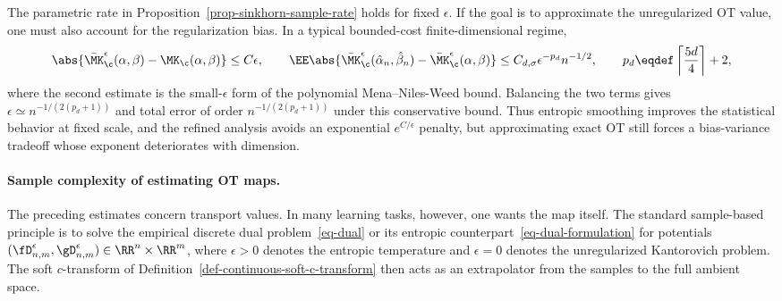 \begin{rem}\label{rem-sinkhorn-no-free-lunch}
	The parametric rate in Proposition~\ref{prop-sinkhorn-sample-rate} holds for fixed $\epsilon$. If the goal is to approximate the unregularized OT value, one must also account for the regularization bias. In a typical bounded-cost finite-dimensional regime,
	\[
		\abs{\bar\MK_\c^\epsilon(\alpha,\beta)-\MK_\c(\alpha,\beta)}
		\leq C\epsilon,
		\qquad
		\EE\abs{\bar\MK_\c^\epsilon(\hat\alpha_n,\hat\beta_n)-\bar\MK_\c^\epsilon(\alpha,\beta)}
		\leq C_{d,\sigma}\epsilon^{-p_d}n^{-1/2},
		\qquad
		p_d\eqdef\left\lceil\frac{5d}{4}\right\rceil+2,
	\]
	where the second estimate is the small-$\epsilon$ form of the polynomial Mena--Niles-Weed bound. Balancing the two terms gives \(\epsilon\simeq n^{-1/(2(p_d+1))}\) and total error of order \(n^{-1/(2(p_d+1))}\) under this conservative bound. Thus entropic smoothing improves the statistical behavior at fixed scale, and the refined analysis avoids an exponential \(e^{C/\epsilon}\) penalty, but approximating exact OT still forces a bias-variance tradeoff whose exponent deteriorates with dimension.
\end{rem}

\paragraph{Sample complexity of estimating OT maps.}
The preceding estimates concern transport values. In many learning tasks, however, one wants the map itself. The standard sample-based principle is to solve the empirical discrete dual problem~\eqref{eq-dual} or its entropic counterpart~\eqref{eq-dual-formulation} for potentials \((\fD_{n,m}^\epsilon,\gD_{n,m}^\epsilon)\in\RR^n\times\RR^m\), where \(\epsilon>0\) denotes the entropic temperature and \(\epsilon=0\) denotes the unregularized Kantorovich problem. The soft \(c\)-transform of Definition~\ref{def-continuous-soft-c-transform} then acts as an extrapolator from the samples to the full ambient space.


